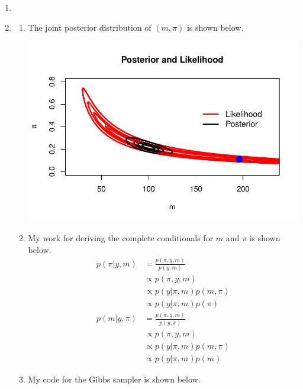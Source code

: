 \documentclass[12pt]{article}\usepackage[]{graphicx}\usepackage[]{color}
\newenvironment{knitrout}{}{} %
\begin{document}
\begin{enumerate}
\begin{enumerate}
\begin{knitrout}
\end{knitrout}

\item

\item \begin{enumerate}

\item The joint posterior distribution of $(m, \pi)$ is shown below.

\begin{knitrout}\footnotesize
{}\color{fgcolor}
\includegraphics[width=\linewidth]{figure/jointpost-1} 

\end{knitrout}

\item My work for deriving the complete conditionals for $m$ and $\pi$ is shown below.
\begin{align*}
p(\pi|y, m) &= \frac{p(\pi, y, m)}{p(y, m)} \\
&\propto p(\pi, y, m) \\
&\propto p(y|\pi, m)p(m, \pi) \\
&\propto p(y|\pi, m)p(\pi) \\
p(m|y, \pi) &= \frac{p(\pi, y, m)}{p(y, \pi)} \\
&\propto p(\pi, y, m) \\
&\propto p(y|\pi, m)p(m, \pi) \\
&\propto p(y|\pi, m)p(m)
\end{align*}

\item My code for the Gibbs sampler is shown below.


\end{enumerate}
\end{enumerate}
\end{enumerate}
\end{document}
